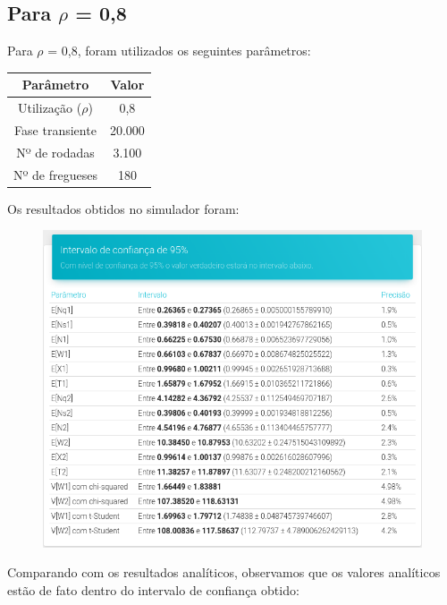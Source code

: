\documentclass[a4paper,12pt]{report}
\begin{document}
\subsection{Para $\rho$ = 0,8}
Para $\rho$ = 0,8, foram utilizados os seguintes parâmetros:

\vspace{-5mm}
\begin{center}
\begin{tabular}{ c c }
  \hline
  \textbf{Parâmetro} & \textbf{Valor}\\
  \hline
  Utilização ($\rho$) & 0,8\\
  Fase transiente & 20.000\\
  Nº de rodadas & 3.100\\
  Nº de fregueses & 180\\
  \hline
\end{tabular}
\end{center}

Os resultados obtidos no simulador foram:
\begin{figure}[H]
\includegraphics[width=1\textwidth]{./graficos/cap4/rho08.png}
\vspace{-10mm}
\end{figure}

Comparando com os resultados analíticos, observamos que os valores analíticos estão de fato dentro do intervalo de confiança obtido:
\end{document}
